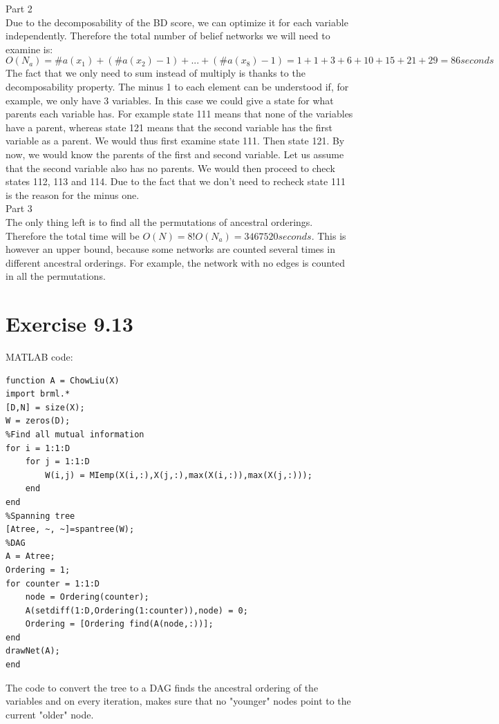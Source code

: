\documentclass[11pt,a4paper,oneside]{report}
\begin{document}
Part 2\\
Due to the decomposability of the BD score, we can optimize it for each variable independently. Therefore the total number of belief networks we will need to examine is:
$$O(N_a)=\#a(x_1) + (\#a(x_2)-1)+...+(\#a(x_8)-1)= 1+1+3+6+10+15+21+29=86 seconds$$
The fact that we only need to sum instead of multiply is thanks to the decomposability property. The minus 1 to each element can be understood if, for example, we only have 3 variables. In this case we could give a state for what parents each variable has. For example state 111 means that none of the variables have a parent, whereas state 121 means that the second variable has the first variable as a parent. We would thus first examine state 111. Then state 121. By now, we would know the parents of the first and second variable. Let us assume that the second variable also has no parents. We would then proceed to check states 112, 113 and 114. Due to the fact that we don't need to recheck state 111 is the reason for the minus one.\\

Part 3\\
The only thing left is to find all the permutations of ancestral orderings. Therefore the total time will be $O(N) = 8!O(N_a)=3467520 seconds$. This is however an upper bound, because some networks are counted several times in different ancestral orderings. For example, the network with no edges is counted in all the permutations.

\section*{Exercise 9.13}

MATLAB code:
\begin{lstlisting}
function A = ChowLiu(X)
import brml.*
[D,N] = size(X);
W = zeros(D);
%Find all mutual information
for i = 1:1:D
    for j = 1:1:D
        W(i,j) = MIemp(X(i,:),X(j,:),max(X(i,:)),max(X(j,:)));
    end
end
%Spanning tree
[Atree, ~, ~]=spantree(W);
%DAG
A = Atree;
Ordering = 1;
for counter = 1:1:D
    node = Ordering(counter);
    A(setdiff(1:D,Ordering(1:counter)),node) = 0;
    Ordering = [Ordering find(A(node,:))];
end
drawNet(A);
end
\end{lstlisting}

The code to convert the tree to a DAG finds the ancestral ordering of the variables and on every iteration, makes sure that no "younger" nodes point to the current "older" node.
\end{document}
